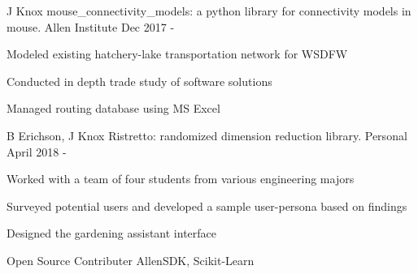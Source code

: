 


\begin{cventries}

  \cventry
    {J Knox} %
    {mouse\_connectivity\_models: a python library for connectivity models in mouse.} %
    {Allen Institute} %
    {Dec 2017 -} %
    {
      \begin{cvitems} %
        \item {Modeled existing hatchery-lake transportation network for WSDFW}
        \item {Conducted in depth trade study of software solutions}
        \item {Managed routing database using MS Excel}
      \end{cvitems}
    }

  \cventry
    {B Erichson, J Knox} %
    {Ristretto: randomized dimension reduction library.} %
    {Personal} %
    {April 2018 -} %
    {
      \begin{cvitems} %
        \item {Worked with a team of four students from various engineering majors}
        \item {Surveyed potential users and developed a sample user-persona based on findings}
        \item {Designed the gardening assistant interface}
      \end{cvitems}
    }

\end{cventries}


\begin{cvskills}

  \cvskill
    {Open Source Contributer}
    {AllenSDK, Scikit-Learn}


\end{cvskills}
